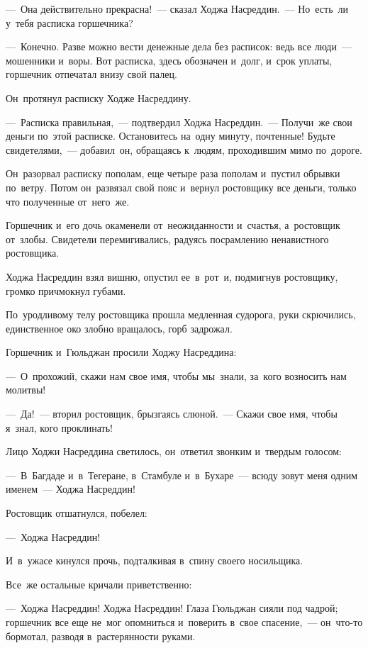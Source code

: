 \documentclass[12pt,a4paper]{book}
\begin{document}
—~Она действительно прекрасна!~— сказал Ходжа Насреддин.~— Но~есть~ли у~тебя расписка горшечника?

—~Конечно. Разве можно вести денежные дела без расписок: ведь все люди~— мошенники и~воры. Вот расписка, здесь обозначен и~долг, и~срок уплаты, горшечник отпечатал внизу свой палец.

Он~протянул расписку Ходже Насреддину.

—~Расписка правильная,~— подтвердил Ходжа Насреддин.~— Получи~же свои деньги по~этой расписке. Остановитесь на~одну минуту, почтенные! Будьте свидетелями,~— добавил~он, обращаясь к~людям, проходившим мимо по~дороге.

Он~разорвал расписку пополам, еще четыре раза пополам и~пустил обрывки по~ветру. Потом он~развязал свой пояс и~вернул ростовщику все деньги, только что полученные от~него~же.

Горшечник и~его дочь окаменели от~неожиданности и~счастья, а~ростовщик от~злобы. Свидетели перемигивались, радуясь посрамлению ненавистного ростовщика.

Ходжа Насреддин взял вишню, опустил ее~в~рот~и, подмигнув ростовщику, громко причмокнул губами.

По~уродливому телу ростовщика прошла медленная судорога, руки скрючились, единственное око злобно вращалось, горб задрожал.

Горшечник и~Гюльджан просили Ходжу Насреддина:

—~О~прохожий, скажи нам свое имя, чтобы мы~знали, за~кого возносить нам молитвы!

—~Да!~— вторил ростовщик, брызгаясь слюной.~— Скажи свое имя, чтобы я~знал, кого проклинать!

Лицо Ходжи Насреддина светилось, он~ответил звонким и~твердым голосом:

—~В~Багдаде и~в~Тегеране, в~Стамбуле и~в~Бухаре~— всюду зовут меня одним именем~— Ходжа Насреддин!

Ростовщик отшатнулся, побелел:

—~Ходжа Насреддин!

И~в~ужасе кинулся прочь, подталкивая в~спину своего носильщика.

Все~же остальные кричали приветственно:

—~Ходжа Насреддин! Ходжа Насреддин! Глаза Гюльджан сияли под чадрой; горшечник все еще не~мог опомниться и~поверить в~свое спасение,~— он~что-то бормотал, разводя в~растерянности руками.


\chapter{}
\end{document}

